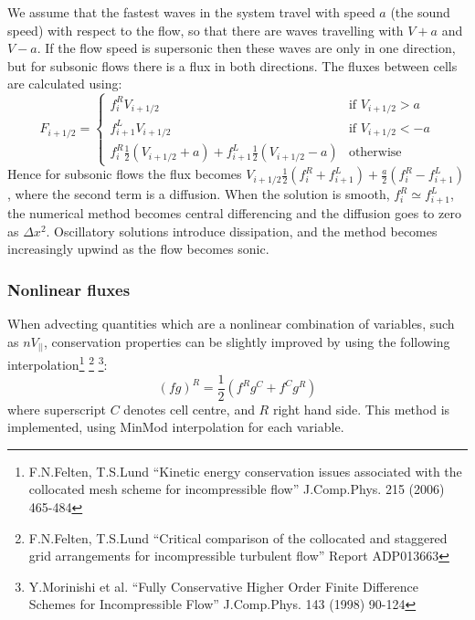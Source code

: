 \documentclass[12pt,a4paper]{article}
\begin{document}
We assume that the fastest waves in the system travel with speed $a$ (the sound speed) with respect to the flow, so that there are
waves travelling with $V+a$ and $V-a$. If the flow speed is supersonic then these waves are only in one direction, but for subsonic flows there is a flux in both directions. The fluxes between
cells are calculated using:
\begin{equation}
F_{i+1/2} = \left\{\begin{array}{ll}
f^R_iV_{i+1/2} & \textrm{if $V_{i+1/2} > a$} \\
f^L_{i+1}V_{i+1/2} & \textrm{if $V_{i+1/2} < -a$} \\
f^R_i\frac{1}{2}\left(V_{i+1/2} +a\right) + f^L_{i+1}\frac{1}{2}\left(V_{i+1/2} - a\right) & \textrm{otherwise}
\end{array}\right.
\label{eq:splitfluxes}
\end{equation}
Hence for subsonic flows the flux becomes $V_{i+1/2}\frac{1}{2}\left(f^R_i + f^L_{i+1}\right) + \frac{a}{2}\left(f^R_i - f^L_{i+1}\right)$, where the second term is a diffusion. When the solution is smooth, $f^R_{i}\simeq f^L_{i+1}$, the numerical method becomes central differencing and the diffusion goes to zero as $\Delta x^2$. Oscillatory solutions introduce dissipation, and the method becomes increasingly upwind as the flow becomes sonic.

\subsubsection{Nonlinear fluxes}
\label{sec:nonlinflux}

When advecting quantities which are a nonlinear combination of variables, such as $nV_{||}$, 
conservation properties can be slightly improved by using the following interpolation\footnote{F.N.Felten, T.S.Lund ``Kinetic energy conservation issues associated with the collocated mesh scheme for incompressible flow'' J.Comp.Phys. 215 (2006) 465-484}
\footnote{F.N.Felten, T.S.Lund ``Critical comparison of the collocated and staggered grid arrangements for incompressible turbulent flow'' Report ADP013663}
\footnote{Y.Morinishi et al. ``Fully Conservative Higher Order Finite Difference Schemes for Incompressible Flow'' J.Comp.Phys. 143 (1998) 90-124}:
\begin{equation}
\left(fg\right)^R = \frac{1}{2}\left(f^Rg^C + f^Cg^R\right)
\end{equation}
where superscript $C$ denotes cell centre, and $R$ right hand side. This method is implemented, using
MinMod interpolation for each variable.
\end{document}
